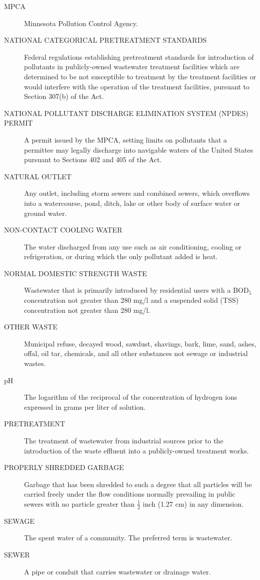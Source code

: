 \begin{description}
\item[MPCA] Minnesota Pollution Control Agency.
\item[NATIONAL CATEGORICAL PRETREATMENT STANDARDS] Federal regulations establishing pretreatment standards for introduction of pollutants in publicly-owned wastewater treatment facilities which are determined to be not susceptible to treatment by the treatment facilities or would interfere with the operation of the treatment facilities, pursuant to Section 307(b) of the Act.
\item[NATIONAL POLLUTANT DISCHARGE ELIMINATION SYSTEM (NPDES) PERMIT] A permit issued by the MPCA, setting limits on pollutants that a permittee may legally discharge into navigable waters of the United States pursuant to Sections 402 and 405 of the Act.
\item[NATURAL OUTLET] Any outlet, including storm sewers and combined sewers, which overflows into a watercourse, pond, ditch, lake or other body of surface water or ground water.
\item[NON-CONTACT COOLING WATER] The water discharged from any use such as air conditioning, cooling or refrigeration, or during which the only pollutant added is heat.
\item[NORMAL DOMESTIC STRENGTH WASTE] Wastewater that is primarily introduced by residential users with a BOD$_{5}$ concentration not greater than 280 mg/l and a suspended solid (TSS) concentration not greater than 280 mg/l.
\item[OTHER WASTE] Municipal refuse, decayed wood, sawdust, shavings, bark, lime, sand, ashes, offal, oil tar, chemicals, and all other substances not sewage or industrial wastes.
\item[pH] The logarithm of the reciprocal of the concentration of hydrogen ions expressed in grams per liter of solution.
\item[PRETREATMENT] The treatment of wastewater from industrial sources prior to the introduction of the waste effluent into a publicly-owned treatment works.
\item[PROPERLY SHREDDED GARBAGE] Garbage that has been shredded to such a degree that all particles will be carried freely under the flow conditions normally prevailing in public sewers with no particle greater than $\frac{1}{2}$ inch (1.27 cm) in any dimension.
\item[SEWAGE] The spent water of a community.  The preferred term is wastewater.
\item[SEWER] A pipe or conduit that carries wastewater or drainage water.

\end{description}
